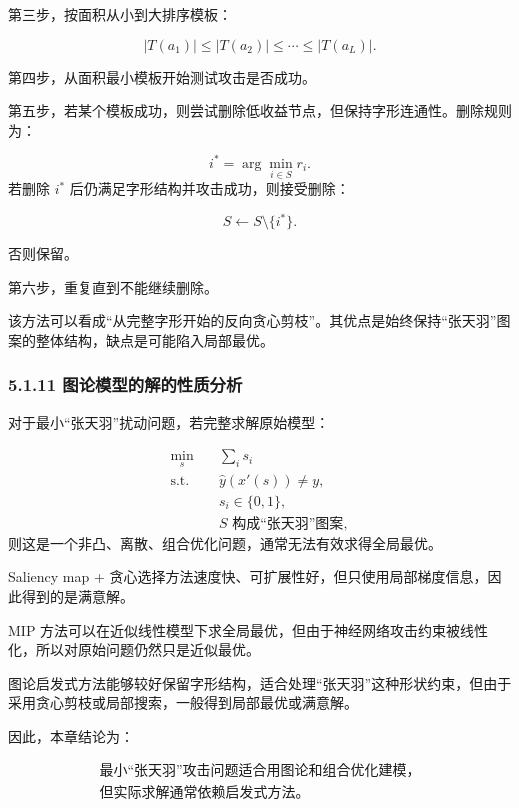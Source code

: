 ﻿\documentclass[UTF8,zihao=-4,fontset=none]{ctexart}
\begin{document}
第三步，按面积从小到大排序模板：

\[
|T(a_1)|\le |T(a_2)|\le \cdots\le |T(a_L)|.
\]

第四步，从面积最小模板开始测试攻击是否成功。

第五步，若某个模板成功，则尝试删除低收益节点，但保持字形连通性。删除规则为：

\[
i^*
=
\arg\min_{i\in S}r_i.
\]
\noindent 若删除 \(i^*\) 后仍满足字形结构并攻击成功，则接受删除：

\[
S\leftarrow S\setminus\{i^*\}.
\]

否则保留。

第六步，重复直到不能继续删除。

该方法可以看成“从完整字形开始的反向贪心剪枝”。其优点是始终保持“张天羽”图案的整体结构，缺点是可能陷入局部最优。

\subsubsection*{5.1.11 图论模型的解的性质分析}
{}

对于最小“张天羽”扰动问题，若完整求解原始模型：

\[
\begin{aligned}
\min_s
\quad
&
\sum_i s_i\\
\mathrm{s.t.}
\quad
&
\hat y(x'(s))\ne y,\\
&
s_i\in\{0,1\},\\
&
S\text{ 构成“张天羽”图案},
\end{aligned}
\]
\noindent 则这是一个非凸、离散、组合优化问题，通常无法有效求得全局最优。

Saliency map + 贪心选择方法速度快、可扩展性好，但只使用局部梯度信息，因此得到的是满意解。

MIP 方法可以在近似线性模型下求全局最优，但由于神经网络攻击约束被线性化，所以对原始问题仍然只是近似最优。

图论启发式方法能够较好保留字形结构，适合处理“张天羽”这种形状约束，但由于采用贪心剪枝或局部搜索，一般得到局部最优或满意解。

因此，本章结论为：

\[
\begin{gathered}
\text{最小“张天羽”攻击问题适合用图论和组合优化建模，}\\
\text{但实际求解通常依赖启发式方法。}
\end{gathered}
\]
\end{document}
